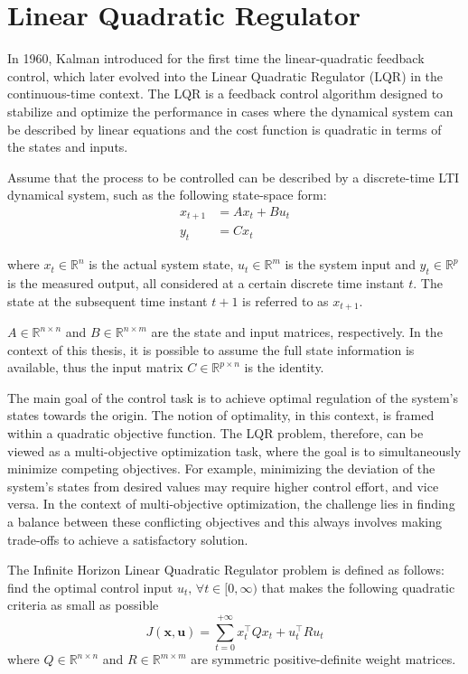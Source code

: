 \documentclass[a4paper,12pt,oneside]{book}
\begin{document}
\section{Linear Quadratic Regulator}
In 1960, Kalman introduced for the first time the linear-quadratic feedback control, which later evolved into the Linear Quadratic Regulator (LQR) \cite{kalman_contributions} in the continuous-time context. 
The LQR is a feedback control algorithm designed to stabilize and optimize the performance in cases where the dynamical system can be described by linear equations and the cost function is quadratic in terms of the states and inputs. 

\bigskip
Assume that the process to be controlled can be described by a discrete-time LTI dynamical system, such as the following state-space form:
\begin{equation} 
\begin{aligned}
    x_{t+1} &= A x_t + B u_t \\
    y_t &= C x_t
\end{aligned}
\label{eq:Linear_model}
\end{equation}

where $x_t \in \mathbb{R}^n$ is the actual system state, $u_t \in \mathbb{R}^m$ is the system input and $y_t \in \mathbb{R}^p$ is the measured output, all considered at a certain discrete time instant $t$. 
The state at the subsequent time instant $t+1$ is referred to as $x_{t+1}$.

$A \in \mathbb{R}^{n\times n}$ and $B\in \mathbb{R}^{n\times m}$ are the state and input matrices, respectively.
In the context of this thesis, it is possible to assume the full state information is available, thus the input matrix $C \in \mathbb{R}^{p\times n}$ is the identity. 

\bigskip
The main goal of the control task is to achieve optimal regulation of the system's states towards the origin. 
The notion of optimality, in this context, is framed within a quadratic objective function.
The LQR problem, therefore, can be viewed as a multi-objective optimization task, where the goal is to simultaneously minimize competing objectives.
For example, minimizing the deviation of the system's states from desired values may require higher control effort, and vice versa.
In the context of multi-objective optimization, the challenge lies in finding a balance between these conflicting objectives and this always involves making trade-offs to achieve a satisfactory solution.

\bigskip
The Infinite Horizon Linear Quadratic Regulator problem is defined as follows:
find the optimal control input $u_t, \, \forall t \in [0, \infty)$ that makes the following quadratic criteria as small as possible
\begin{equation}
    J(\boldsymbol{x}, \boldsymbol{u})  = \sum_{t=0} ^{+\infty} x_t^\top Q x_t + u_t ^\top R u_t
\label{Quadratic_cost_funct}
\end{equation}
where $Q \in \mathbb{R}^{n \times n}$ and $R \in \mathbb{R}^{m \times m}$ are symmetric positive-definite weight matrices.
\end{document}
